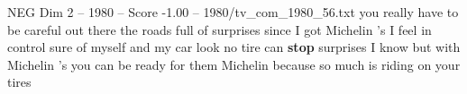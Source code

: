 \begin{textsample}{NEG Dim 2 – 1980 – Score -1.00 – 1980/tv\_com\_1980\_56.txt}  \label{ex:f2_neg_027}
you really have to be careful out there the roads full of surprises since I got Michelin 's I feel in control sure of myself and my car look no tire can \textbf{stop} surprises I know but with Michelin 's you can be ready for them Michelin because so much is riding on your tires

\end{textsample}
